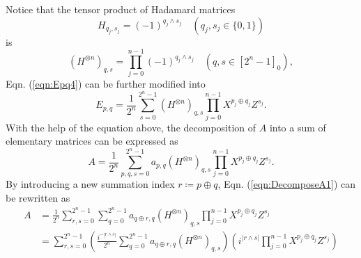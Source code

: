 Notice that the tensor product of Hadamard matrices
\begin{equation}
    H_{q_j,s_j}=(-1)^{q_j\wedge s_j} \quad (q_j, s_j\in\{0,1\})
\end{equation}
is
\begin{equation}
    (H^{\otimes n})_{q,s}=\prod_{j=0}^{n-1}(-1)^{q_j\wedge s_j} \quad (q,s\in[2^n-1]_0),
\end{equation}
Eqn. (\ref{eqn:Epq4}) can be further modified into
\begin{equation}
    E_{p,q}=\frac{1}{2^n}\sum_{s=0}^{2^n-1}(H^{\otimes n})_{q,s}\prod_{j=0}^{n-1}X^{p_j\oplus q_j}Z^{s_j}.
    \label{eqn:Epq5}
\end{equation}
With the help of the equation above, the decomposition of $A$ into a sum of elementary matrices can be expressed as
\begin{equation}
    A=\frac{1}{2^n}\sum_{p,q,s=0}^{2^n-1}a_{p,q}(H^{\otimes n})_{q,s}\prod_{j=0}^{n-1}X^{p_j\oplus q_j}Z^{s_j}.
    \label{eqn:DecomposeA1}
\end{equation}
By introducing a new summation index $r\coloneqq p\oplus q$, Eqn. (\ref{eqn:DecomposeA1}) can be rewritten as
\begin{equation}
    \begin{split}
        A&=\frac{1}{2^n}\sum_{r,s=0}^{2^n-1}\sum_{q=0}^{2^n-1}a_{q\oplus r,q}(H^{\otimes n})_{q,s}\prod_{j=0}^{n-1}X^{p_j\oplus q_j}Z^{s_j}\\
        &=\sum_{r,s=0}^{2^n-1}\left(\frac{i^{-|r\wedge s|}}{2^n}\sum_{q=0}^{2^n-1}a_{q\oplus r,q}(H^{\otimes n})_{q,s}\right)\left(i^{|r\wedge s|}\prod_{j=0}^{n-1}X^{p_j\oplus q_j}Z^{s_j}\right)
    \end{split}
\end{equation}


